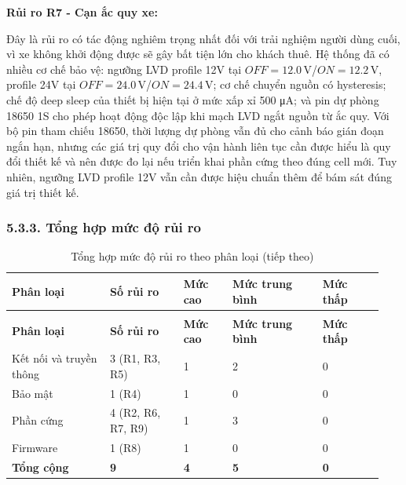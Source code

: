 \documentclass[a4paper]{extarticle}
\newcommand{\thesissettableid}[2]{%
  \renewcommand{\thetable}{#1}%
  \renewcommand{\theHtable}{#2}%
}
\begin{document}
\textbf{Rủi ro R7 - Cạn ắc quy xe:}

Đây là rủi ro có tác động nghiêm trọng nhất đối với trải nghiệm người
dùng cuối, vì xe không khởi động được sẽ gây bất tiện lớn cho khách
thuê. Hệ thống đã có nhiều cơ chế bảo vệ: ngưỡng LVD profile 12V tại
\(OFF = 12.0\,\mathrm{V}\)/\(ON = 12.2\,\mathrm{V}\), profile 24V tại
\(OFF = 24.0\,\mathrm{V}\)/\(ON = 24.4\,\mathrm{V}\); cơ chế chuyển
nguồn có hysteresis; chế độ deep sleep của thiết bị hiện tại ở mức xấp
xỉ 500 μA; và pin dự phòng 18650 1S cho phép hoạt động độc lập khi mạch
LVD ngắt nguồn từ ắc quy. Với bộ pin tham chiếu 18650, thời lượng dự phòng
vẫn đủ cho cảnh báo gián đoạn ngắn hạn, nhưng các giá trị quy đổi cho vận hành liên
tục cần được hiểu là quy đổi thiết kế và nên được đo lại nếu triển khai
phần cứng theo đúng cell mới. Tuy nhiên, ngưỡng LVD profile 12V vẫn cần
được hiệu chuẩn thêm để bám sát đúng giá trị thiết kế.

\subsubsection{5.3.3. Tổng hợp mức độ rủi
ro}\label{533-tux1ed5ng-hux1ee3p-mux1ee9c-ux111ux1ed9-rux1ee7i-ro}


{\thesissettableid{5.9}{tab-ch5-tong-hop-muc-o-rui-ro-theo-phan-loai}
\def\LTcaptype{table}
\begin{longtable}{|L{0.249\linewidth}|L{0.189\linewidth}|L{0.125\linewidth}|L{0.229\linewidth}|L{0.153\linewidth}|}
\caption{Tổng hợp mức độ rủi ro theo phân loại}\label{tab:ch5-tong-hop-muc-o-rui-ro-theo-phan-loai}\\
\hline \textbf{Phân loại} & \textbf{Số rủi ro} & \textbf{Mức cao} & \textbf{Mức trung bình} & \textbf{Mức thấp} \\
\hline
\endfirsthead
\caption[]{Tổng hợp mức độ rủi ro theo phân loại (tiếp theo)}\\
\hline \textbf{Phân loại} & \textbf{Số rủi ro} & \textbf{Mức cao} & \textbf{Mức trung bình} & \textbf{Mức thấp} \\
\hline
\endhead
\hline
\endfoot
\endlastfoot
Kết nối và truyền thông & 3 (R1, R3, R5) & 1 & 2 & 0 \\\hline
Bảo mật & 1 (R4) & 1 & 0 & 0 \\\hline
Phần cứng & 4 (R2, R6, R7, R9) & 1 & 3 & 0 \\\hline
Firmware & 1 (R8) & 1 & 0 & 0 \\\hline
\textbf{Tổng cộng} & \textbf{9} & \textbf{4} & \textbf{5} &
\textbf{0} \\\hline
\end{longtable}
}
\end{document}
